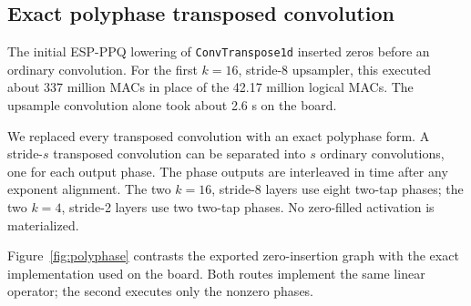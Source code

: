 \documentclass[10pt]{article}
\begin{document}
\subsection{Exact polyphase transposed convolution}
\label{sec:polyphase}

The initial ESP-PPQ lowering of \texttt{ConvTranspose1d} inserted zeros before
an ordinary convolution. For the first $k=16$, stride-8 upsampler, this
executed about 337 million MACs in place of the 42.17 million logical MACs.
The upsample convolution alone took about 2.6 s on the board.

We replaced every transposed convolution with an exact polyphase form. A
stride-$s$ transposed convolution can be separated into $s$ ordinary
convolutions, one for each output phase. The phase outputs are interleaved in
time after any exponent alignment. The two $k=16$, stride-8 layers use eight
two-tap phases; the two $k=4$, stride-2 layers use two two-tap phases. No
zero-filled activation is materialized.

Figure~\ref{fig:polyphase} contrasts the exported zero-insertion graph with
the exact implementation used on the board. Both routes implement the same
linear operator; the second executes only the nonzero phases.
\end{document}
